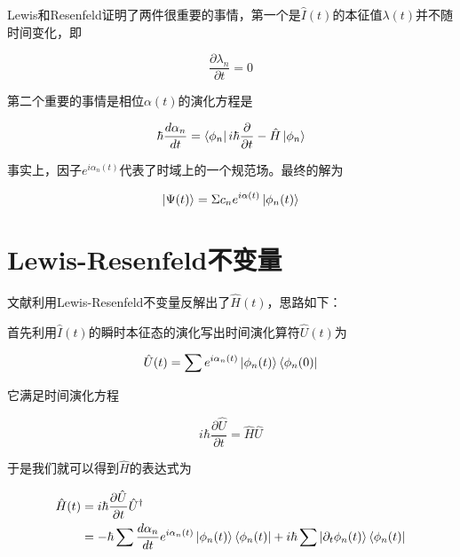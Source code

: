 \documentclass[a4paper]{article}
\begin{document}
        Lewis和Resenfeld证明了两件很重要的事情，第一个是$\hat{I}(t)$的本征值$\lambda(t)$并不随时间变化，即

        \begin{equation}
            \frac{\partial\lambda_n}{\partial t} = 0
        \end{equation}

        第二个重要的事情是相位$\alpha(t)$的演化方程是

        \begin{equation}
            \hbar\frac{d\alpha_n}{dt} = \bra{\phi_n}i\hbar\frac{\partial}{\partial t}-\hat{H}\ket{\phi_n} 
        \end{equation}

        事实上，因子$e^{i\alpha_n(t)}$代表了时域上的一个规范场。最终的解为

        \begin{equation}
            \ket{\Psi(t)} = \Sigma c_n e^{i\alpha(t)} \ket{\phi_n(t)}
        \end{equation}


    \section{Lewis-Resenfeld不变量}

        文献利用Lewis-Resenfeld不变量反解出了$\hat{H}(t)$，思路如下：

        首先利用$\hat{I}(t)$的瞬时本征态的演化写出时间演化算符$\hat{U}(t)$为

        \begin{equation}
            \hat{U}(t) = \sum e^{i\alpha_n(t)}\ket{\phi_n(t)}\bra{\phi_n(0)}
        \end{equation}

        它满足时间演化方程

        \begin{equation}
            i\hbar\frac{\partial\hat{U}}{\partial t} = \hat{H}\hat{U}
        \end{equation}

        于是我们就可以得到$\hat{H}$的表达式为

        \begin{equation}
            \begin{split}
                \hat{H}(t) &= i\hbar\frac{\partial\hat{U}}{\partial t}\hat{U}^\dagger \\
                    &= -\hbar\sum\frac{d\alpha_n}{dt}e^{i\alpha_n(t)}\ket{\phi_n(t)}\bra{\phi_n(t)} + i\hbar\sum\ket{\partial_t\phi_n(t)}\bra{\phi_n(t)}
            \end{split}
        \end{equation}
\end{document}
